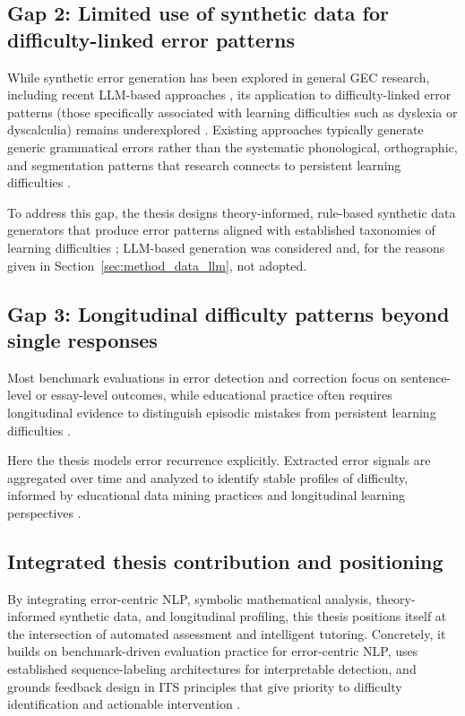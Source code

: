 \subsection{Gap 2: Limited use of synthetic data for difficulty-linked error patterns}
\label{sec:sota_gap_synth}

While synthetic error generation has been explored in general GEC research, including recent LLM-based approaches \parencite{Luhtaru2024}, its application to difficulty-linked error patterns (those specifically associated with learning difficulties such as dyslexia or dyscalculia) remains underexplored \parencite{Lichtarge2020,Bryant2023GECsurvey}. Existing approaches typically generate generic grammatical errors rather than the systematic phonological, orthographic, and segmentation patterns that research connects to persistent learning difficulties \parencite{ShaywitzShaywitz2005}.

To address this gap, the thesis designs theory-informed, rule-based synthetic data generators that produce error patterns aligned with established taxonomies of learning difficulties \parencite{Bryant2023GECsurvey}; LLM-based generation was considered and, for the reasons given in Section~\ref{sec:method_data_llm}, not adopted.

\subsection{Gap 3: Longitudinal difficulty patterns beyond single responses}
\label{sec:sota_gap_long}

Most benchmark evaluations in error detection and correction focus on sentence-level or essay-level outcomes, while educational practice often requires longitudinal evidence to distinguish episodic mistakes from persistent learning difficulties \parencite{RomeroVentura2024}.

Here the thesis models error recurrence explicitly. Extracted error signals are aggregated over time and analyzed to identify stable profiles of difficulty, informed by educational data mining practices and longitudinal learning perspectives \parencite{BakerYacef2009,RomeroVentura2024}.

\subsection{Integrated thesis contribution and positioning}
\label{sec:sota_contrib}

By integrating error-centric NLP, symbolic mathematical analysis, theory-informed synthetic data, and longitudinal profiling, this thesis positions itself at the intersection of automated assessment and intelligent tutoring. Concretely, it builds on benchmark-driven evaluation practice for error-centric NLP, uses established sequence-labeling architectures for interpretable detection, and grounds feedback design in ITS principles that give priority to difficulty identification and actionable intervention \parencite{DahlmeierNg2012,Ng2014,BryantFeliceBriscoe2017,ReiYannakoudakis2016,MaHovy2016,Woolf2010}.


